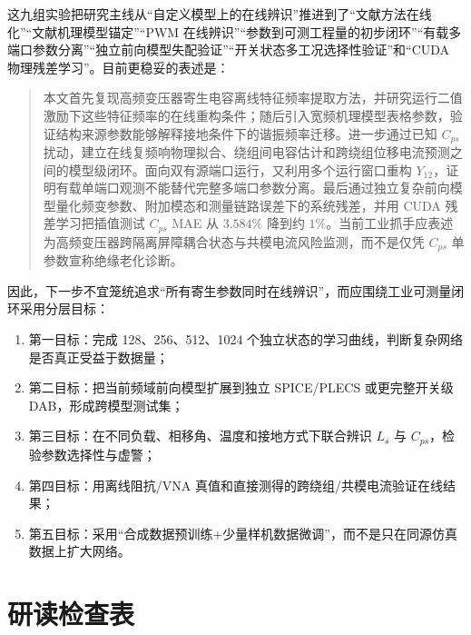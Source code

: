 \documentclass[UTF8,a4paper,12pt]{ctexart}
\begin{document}
这九组实验把研究主线从“自定义模型上的在线辨识”推进到了“文献方法在线化”“文献机理模型锚定”“PWM 在线辨识”“参数到可测工程量的初步闭环”“有载多端口参数分离”“独立前向模型失配验证”“开关状态多工况选择性验证”和“CUDA 物理残差学习”。目前更稳妥的表述是：

\begin{quote}
本文首先复现高频变压器寄生电容离线特征频率提取方法，并研究运行二值激励下这些特征频率的在线重构条件；随后引入宽频机理模型表格参数，验证结构来源参数能够解释接地条件下的谐振频率迁移。进一步通过已知 $C_{ps}$ 扰动，建立在线复频响物理拟合、绕组间电容估计和跨绕组位移电流预测之间的模型级闭环。面向双有源端口运行，又利用多个运行窗口重构 $Y_{12}$，证明有载单端口观测不能替代完整多端口参数分离。最后通过独立复杂前向模型量化频变参数、附加模态和测量链路误差下的系统残差，并用 CUDA 残差学习把插值测试 $C_{ps}$ MAE 从 $3.584\%$ 降到约 $1\%$。当前工业抓手应表述为高频变压器跨隔离屏障耦合状态与共模电流风险监测，而不是仅凭 $C_{ps}$ 单参数宣称绝缘老化诊断。
\end{quote}

因此，下一步不宜笼统追求“所有寄生参数同时在线辨识”，而应围绕工业可测量闭环采用分层目标：

\begin{enumerate}
  \item 第一目标：完成 128、256、512、1024 个独立状态的学习曲线，判断复杂网络是否真正受益于数据量；
  \item 第二目标：把当前频域前向模型扩展到独立 SPICE/PLECS 或更完整开关级 DAB，形成跨模型测试集；
  \item 第三目标：在不同负载、相移角、温度和接地方式下联合辨识 $L_s$ 与 $C_{ps}$，检验参数选择性与虚警；
  \item 第四目标：用离线阻抗/VNA 真值和直接测得的跨绕组/共模电流验证在线结果；
  \item 第五目标：采用“合成数据预训练+少量样机数据微调”，而不是只在同源仿真数据上扩大网络。
\end{enumerate}

\section{研读检查表}
\end{document}
